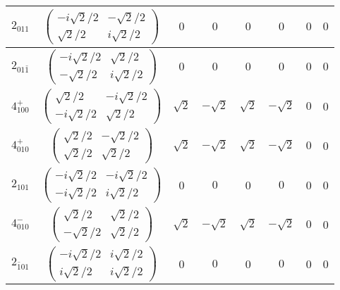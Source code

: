 \documentclass[3p,preprint]{elsarticle}
\begin{document}
\begin{table}[H]
{\begin{tabular}{|c|c||c|c|c|c|c|c|}
			$2_{011}$ &		$\left(\begin{array}{cc} -i\sqrt{2}/2&-\sqrt{2}/2 \\ \sqrt{2}/2&i\sqrt{2}/2 \end{array}\right)$	&$0$ & $0$ & $0$ & $0$ & $0$ & $0$ \\ \hline
			$2_{01\bar{1}}$ &		$\left(\begin{array}{cc} -i\sqrt{2}/2&\sqrt{2}/2 \\ -\sqrt{2}/2&i\sqrt{2}/2 \end{array}\right)$	&$0$ & $0$ & $0$ & $0$ & $0$ & $0$ \\ \hline
			$4^{+}_{100}$ &		$\left(\begin{array}{cc} \sqrt{2}/2&-i\sqrt{2}/2 \\ -i\sqrt{2}/2&\sqrt{2}/2 \end{array}\right)$	&$\sqrt{2}$ & $-\sqrt{2}$ & $\sqrt{2}$ & $-\sqrt{2}$ & $0$ & 0 \\ \hline
			$4^{+}_{010}$ &		$\left(\begin{array}{cc} \sqrt{2}/2&-\sqrt{2}/2 \\ \sqrt{2}/2&\sqrt{2}/2 \end{array}\right)$	&$\sqrt{2}$ & $-\sqrt{2}$ & $\sqrt{2}$ & $-\sqrt{2}$ & $0$ & 0 \\ \hline
			$2_{101}$ &		$\left(\begin{array}{cc} -i\sqrt{2}/2&-i\sqrt{2}/2 \\ -i\sqrt{2}/2&i\sqrt{2}/2 \end{array}\right)$	&0 & $0$ & 0 & $0$ & 0 & 0 \\ \hline
			$4^{-}_{010}$ &		$\left(\begin{array}{cc} \sqrt{2}/2&\sqrt{2}/2 \\ -\sqrt{2}/2&\sqrt{2}/2 \end{array}\right)$	&$\sqrt{2}$ & $-\sqrt{2}$ & $\sqrt{2}$ & $-\sqrt{2}$ & $0$ & 0 \\ \hline
			$2_{\bar{1}01}$ &		$\left(\begin{array}{cc} -i\sqrt{2}/2&i\sqrt{2}/2 \\ i\sqrt{2}/2&i\sqrt{2}/2 \end{array}\right)$	&0 & $0$ & 0 & $0$ & 0 & 0 \\ \hline
		\end{tabular}
	}
\end{table}
\end{document}
